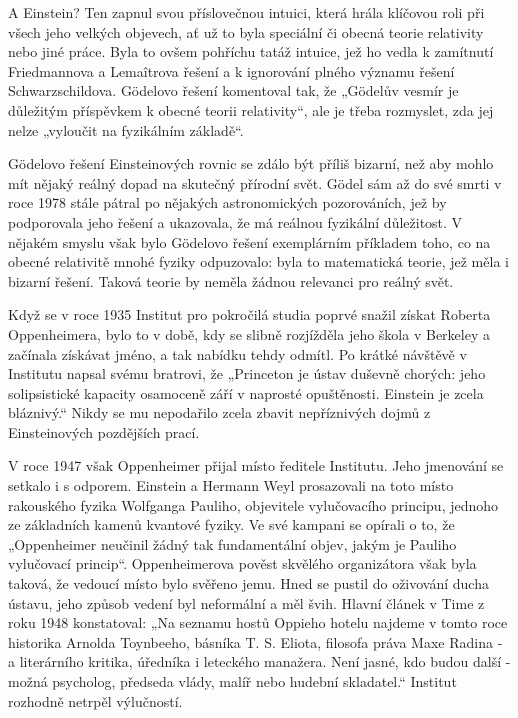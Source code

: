   A Einstein? Ten zapnul svou příslovečnou intuici, která hrála klíčovou roli při všech jeho velkých
  objevech, ať už to byla speciální či obecná teorie relativity nebo jiné práce. Byla to ovšem
  pohříchu tatáž intuice, jež ho vedla k zamítnutí Friedmannova a Lemaîtrova řešení a k ignorování
  plného významu řešení Schwarzschildova. Gödelovo řešení komentoval tak, že „Gödelův vesmír je
  důležitým příspěvkem k obecné teorii relativity“, ale je třeba rozmyslet, zda jej nelze „vyloučit
  na fyzikálním základě“. 
  
  Gödelovo řešení Einsteinových rovnic se zdálo být příliš bizarní, než aby mohlo mít nějaký reálný
  dopad na skutečný přírodní svět. Gödel sám až do své smrti v roce 1978 stále pátral po nějakých
  astronomických pozorováních, jež by podporovala jeho řešení a ukazovala, že má reálnou fyzikální
  důležitost. V nějakém smyslu však bylo Gödelovo řešení exemplárním příkladem toho, co na obecné
  relativitě mnohé fyziky odpuzovalo: byla to matematická teorie, jež měla i bizarní řešení. Taková
  teorie by neměla žádnou relevanci pro reálný svět. 
  
  Když se v roce 1935 Institut pro pokročilá studia poprvé snažil získat Roberta Oppenheimera, bylo
  to v době, kdy se slibně rozjížděla jeho škola v Berkeley a začínala získávat jméno, a tak nabídku
  tehdy odmítl. Po krátké návštěvě v Institutu napsal svému bratrovi, že „Princeton je ústav duševně
  chorých: jeho solipsistické kapacity osamoceně září v naprosté opuštěnosti. Einstein je zcela
  bláznivý.“ Nikdy se mu nepodařilo zcela zbavit nepříznivých dojmů z Einsteinových pozdějších
  prací. 
  
  V roce 1947 však Oppenheimer přijal místo ředitele Institutu. Jeho jmenování se setkalo i s
  odporem. Einstein a Hermann Weyl prosazovali na toto místo rakouského fyzika Wolfganga Pauliho,
  objevitele vylučovacího principu, jednoho ze základních kamenů kvantové fyziky. Ve své kampani se
  opírali o to, že „Oppenheimer neučinil žádný tak fundamentální objev, jakým je Pauliho vylučovací
  princip“. Oppenheimerova pověst skvělého organizátora však byla taková, že vedoucí místo bylo
  svěřeno jemu. Hned se pustil do oživování ducha ústavu, jeho způsob vedení byl neformální a měl
  švih. Hlavní článek v Time z roku 1948 konstatoval: „Na seznamu hostů Oppieho hotelu najdeme v
  tomto roce historika Arnolda Toynbeeho, básníka T. S. Eliota, filosofa práva Maxe Radina - a
  literárního kritika, úředníka i leteckého manažera. Není jasné, kdo budou další - možná psycholog,
  předseda vlády, malíř nebo hudební skladatel.“ Institut rozhodně netrpěl výlučností. 
  
